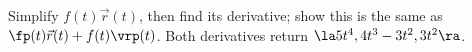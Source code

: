 {Simplify $f(t)\vec r(t)$, then find its derivative; show this is the same as $\fp(t)\vec r(t) + f(t)\vrp(t)$.
}
{
Both derivatives return $\la 5t^4,4t^3-3t^2,3t^2\ra$.
}

